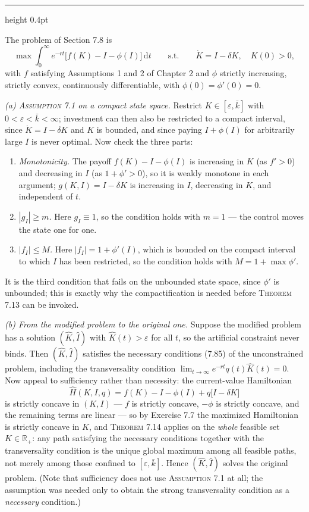 \documentclass[11pt,letterpaper,reqno]{amsart}
\makeatletter
\newcommand{\R}{\mathbb{R}}
\newcommand{\wh}[1]{\widehat{#1}}
\newcommand{\dd}{\,\mathrm{d}}
\newcommand{\dt}[1]{\dot{#1}}
\newcommand{\as@head}[3]{%
  \par\addvspace{1.6ex}\penalty-200\relax
  \phantomsection
  \addcontentsline{toc}{subsection}{#1 #2\texorpdfstring{\ifx\relax#3\relax\else\quad #3\fi}{}}%
  {\color{RuleGrey}\hrule height 0.4pt}%
  \nobreak\vspace{0.8ex}\nobreak
  \noindent{\bfseries #1 #2}%
  \ifx\relax#3\relax\else\quad{\bfseries\itshape #3}\fi
  \par\nobreak\vspace{0.4ex}\nobreak
  \as@beginstatement
}
\newcommand{\as@beginstatement}{\begingroup\itshape\ignorespaces}
\newenvironment{aex}[2]{\as@head{Exercise}{#1}{#2}}{\par\addvspace{1.2ex}}
\newcommand{\bk}[1]{\textup{\textsc{#1}}}
\renewcommand{\as@beginstatement}{\ignorespaces}
\makeatother
\begin{document}
\begin{aex}{7.27}{}
The problem of Section 7.8 is
\[
\max\int_0^{\infty}e^{-rt}\bigl[f(K)-I-\phi(I)\bigr]\dd t
\qquad\text{s.t.}\qquad
\dt K=I-\delta K,\quad K(0)>0 ,
\]
with $f$ satisfying Assumptions 1 and 2 of Chapter 2 and $\phi$ strictly increasing, strictly convex,
continuously differentiable, with $\phi(0)=\phi'(0)=0$.

\emph{(a) \bk{Assumption 7.1} on a compact state space.}  Restrict $K\in[\varepsilon,\bar k]$ with
$0<\varepsilon<\bar k<\infty$; investment can then also be restricted to a compact interval, since
$\dt K=I-\delta K$ and $K$ is bounded, and since paying $I+\phi(I)$ for arbitrarily large $I$ is never
optimal.  Now check the three parts:
\begin{enumerate}
\item \emph{Monotonicity.}  The payoff $f(K)-I-\phi(I)$ is increasing in $K$ (as $f'>0$) and decreasing in
      $I$ (as $1+\phi'>0$), so it is weakly monotone in each argument; $g(K,I)=I-\delta K$ is increasing in
      $I$, decreasing in $K$, and independent of $t$.
\item \emph{$|g_I|\ge m$.}  Here $g_I\equiv1$, so the condition holds with $m=1$ --- the control moves the
      state one for one.
\item \emph{$|f_I|\le M$.}  Here $|f_I|=1+\phi'(I)$, which is bounded on the compact interval to which $I$
      has been restricted, so the condition holds with $M=1+\max\phi'$.
\end{enumerate}
It is the third condition that fails on the unbounded state space, since $\phi'$ is unbounded; this is
exactly why the compactification is needed before \bk{Theorem 7.13} can be invoked.

\emph{(b) From the modified problem to the original one.}  Suppose the modified problem has a solution
$(\wh K,\wh I)$ with $\wh K(t)>\varepsilon$ for all $t$, so the artificial constraint never binds.  Then
$(\wh K,\wh I)$ satisfies the necessary conditions \bk{(7.85)} of the unconstrained problem, including the
transversality condition $\lim_{t\to\infty}e^{-rt}q(t)\wh K(t)=0$.  Now appeal to sufficiency rather than
necessity: the current-value Hamiltonian
\[
\wh H(K,I,q)=f(K)-I-\phi(I)+q\bigl[I-\delta K\bigr]
\]
is strictly concave in $(K,I)$ --- $f$ is strictly concave, $-\phi$ is strictly concave, and the remaining
terms are linear --- so by Exercise 7.7 the maximized Hamiltonian is strictly concave in $K$, and
\bk{Theorem 7.14} applies on the \emph{whole} feasible set $K\in\R_+$: any path satisfying the necessary
conditions together with the transversality condition is the unique global maximum among all feasible
paths, not merely among those confined to $[\varepsilon,\bar k]$.  Hence $(\wh K,\wh I)$ solves the original
problem.  (Note that sufficiency does not use \bk{Assumption 7.1} at all; the assumption was needed only to
obtain the strong transversality condition as a \emph{necessary} condition.)


\end{aex}
\end{document}
